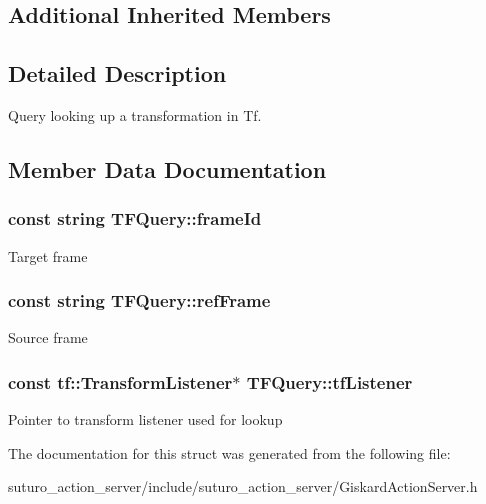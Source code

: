 \subsection*{Additional Inherited Members}


\subsection{Detailed Description}
Query looking up a transformation in Tf. 

\subsection{Member Data Documentation}
\hypertarget{structTFQuery_a1827c7ca85239f98da28cb9bebf630bb}{
\subsubsection[{frame\-Id}]{\setlength{\rightskip}{0pt plus 5cm}const string T\-F\-Query\-::frame\-Id\hspace{0.3cm}{\ttfamily [private]}}}\label{structTFQuery_a1827c7ca85239f98da28cb9bebf630bb}
Target frame \hypertarget{structTFQuery_aa5198bb657f18acf54ca14f5f2e77728}{
\subsubsection[{ref\-Frame}]{\setlength{\rightskip}{0pt plus 5cm}const string T\-F\-Query\-::ref\-Frame\hspace{0.3cm}{\ttfamily [private]}}}\label{structTFQuery_aa5198bb657f18acf54ca14f5f2e77728}
Source frame \hypertarget{structTFQuery_af963e7f338115d80baa86aeea7bd7570}{
\subsubsection[{tf\-Listener}]{\setlength{\rightskip}{0pt plus 5cm}const tf\-::\-Transform\-Listener$\ast$ T\-F\-Query\-::tf\-Listener\hspace{0.3cm}{\ttfamily [private]}}}\label{structTFQuery_af963e7f338115d80baa86aeea7bd7570}
Pointer to transform listener used for lookup 

The documentation for this struct was generated from the following file\-:\begin{DoxyCompactItemize}
\item 
suturo\-\_\-action\-\_\-server/include/suturo\-\_\-action\-\_\-server/Giskard\-Action\-Server.\-h\end{DoxyCompactItemize}
